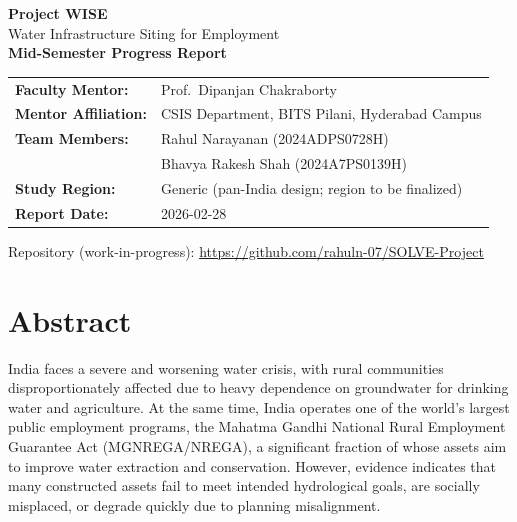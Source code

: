 \documentclass[12pt,a4paper]{report}
\newcommand{\ProjectTitle}{Project WISE}
\newcommand{\ProjectSubtitle}{Water Infrastructure Siting for Employment}
\newcommand{\MentorName}{Prof.\ Dipanjan Chakraborty}
\newcommand{\MentorDept}{CSIS Department, BITS Pilani, Hyderabad Campus}
\newcommand{\StudentA}{Rahul Narayanan (2024ADPS0728H)}
\newcommand{\StudentB}{Bhavya Rakesh Shah (2024A7PS0139H)}
\newcommand{\ReportDate}{2026-02-28}
\newcommand{\StudyRegion}{Generic (pan-India design; region to be finalized)}
\begin{document}
\begin{titlepage}
  \centering

  \vspace*{0.5cm}
  \begin{figure}[h!]
  \centering
   \end{figure}

  {\Large \textbf{\ProjectTitle}}\\[0.2cm]
  {\large \ProjectSubtitle}\\[0.7cm]

  {\large \textbf{Mid-Semester Progress Report}}\\[0.8cm]

  \begin{tabular}{>{\bfseries}p{} p{}}
    Faculty Mentor: & \MentorName\\
    Mentor Affiliation: & \MentorDept\\
    Team Members: & \StudentA\\
    & \StudentB\\
    Study Region: & \StudyRegion\\
    Report Date: & \ReportDate\\
  \end{tabular}

  \vfill
  {\small Repository (work-in-progress): \url{https://github.com/rahuln-07/SOLVE-Project}}\\
  \vspace*{0.5cm}
\end{titlepage}

\tableofcontents
\listoftables
\clearpage

\chapter*{Abstract}
India faces a severe and worsening water crisis, with rural communities disproportionately affected due to heavy dependence on groundwater for drinking water and agriculture. At the same time, India operates one of the world’s largest public employment programs, the Mahatma Gandhi National Rural Employment Guarantee Act (MGNREGA/NREGA), a significant fraction of whose assets aim to improve water extraction and conservation. However, evidence indicates that many constructed assets fail to meet intended hydrological goals, are socially misplaced, or degrade quickly due to planning misalignment.
\end{document}
